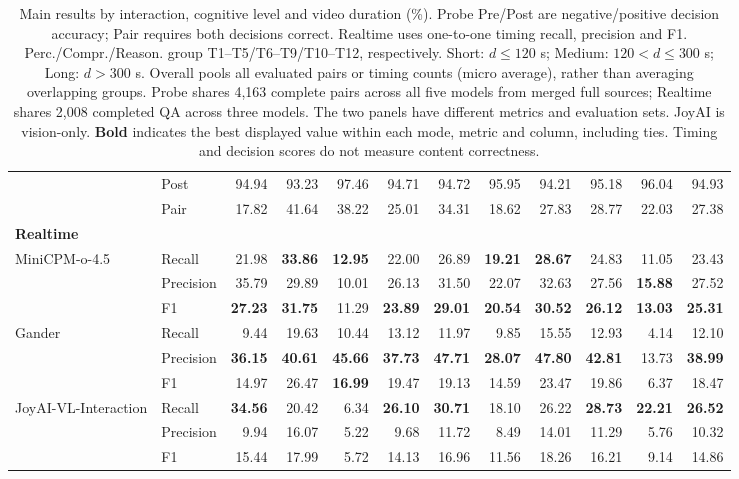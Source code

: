 \begin{table}[t]
{\begin{tabular}{ll*{10}{r}}
 & Post & 94.94 & 93.23 & 97.46 & 94.71 & 94.72 & 95.95 & 94.21 & 95.18 & 96.04 & 94.93 \\
 & Pair & 17.82 & 41.64 & 38.22 & 25.01 & 34.31 & 18.62 & 27.83 & 28.77 & 22.03 & 27.38 \\
\hline
\multicolumn{12}{l}{\textbf{Realtime}} \\
\hline
MiniCPM-o-4.5 & Recall & 21.98 & \textbf{33.86} & \textbf{12.95} & 22.00 & 26.89 & \textbf{19.21} & \textbf{28.67} & 24.83 & 11.05 & 23.43 \\
 & Precision & 35.79 & 29.89 & 10.01 & 26.13 & 31.50 & 22.07 & 32.63 & 27.56 & \textbf{15.88} & 27.52 \\
 & F1 & \textbf{27.23} & \textbf{31.75} & 11.29 & \textbf{23.89} & \textbf{29.01} & \textbf{20.54} & \textbf{30.52} & \textbf{26.12} & \textbf{13.03} & \textbf{25.31} \\
Gander & Recall & 9.44 & 19.63 & 10.44 & 13.12 & 11.97 & 9.85 & 15.55 & 12.93 & 4.14 & 12.10 \\
 & Precision & \textbf{36.15} & \textbf{40.61} & \textbf{45.66} & \textbf{37.73} & \textbf{47.71} & \textbf{28.07} & \textbf{47.80} & \textbf{42.81} & 13.73 & \textbf{38.99} \\
 & F1 & 14.97 & 26.47 & \textbf{16.99} & 19.47 & 19.13 & 14.59 & 23.47 & 19.86 & 6.37 & 18.47 \\
JoyAI-VL-Interaction & Recall & \textbf{34.56} & 20.42 & 6.34 & \textbf{26.10} & \textbf{30.71} & 18.10 & 26.22 & \textbf{28.73} & \textbf{22.21} & \textbf{26.52} \\
 & Precision & 9.94 & 16.07 & 5.22 & 9.68 & 11.72 & 8.49 & 14.01 & 11.29 & 5.76 & 10.32 \\
 & F1 & 15.44 & 17.99 & 5.72 & 14.13 & 16.96 & 11.56 & 18.26 & 16.21 & 9.14 & 14.86 \\
\hline
\end{tabular}
}
\caption{Main results by interaction, cognitive level and video duration (\%). Probe Pre/Post are negative/positive decision accuracy; Pair requires both decisions correct. Realtime uses one-to-one timing recall, precision and F1. Perc./Compr./Reason. group T1--T5/T6--T9/T10--T12, respectively. Short: $d\leq120$ s; Medium: $120<d\leq300$ s; Long: $d>300$ s. Overall pools all evaluated pairs or timing counts (micro average), rather than averaging overlapping groups. Probe shares 4,163 complete pairs across all five models from merged full sources; Realtime shares 2,008 completed QA across three models. The two panels have different metrics and evaluation sets. JoyAI is vision-only. \textbf{Bold} indicates the best displayed value within each mode, metric and column, including ties. Timing and decision scores do not measure content correctness.}
\label{tab:main-results}
\end{table}

